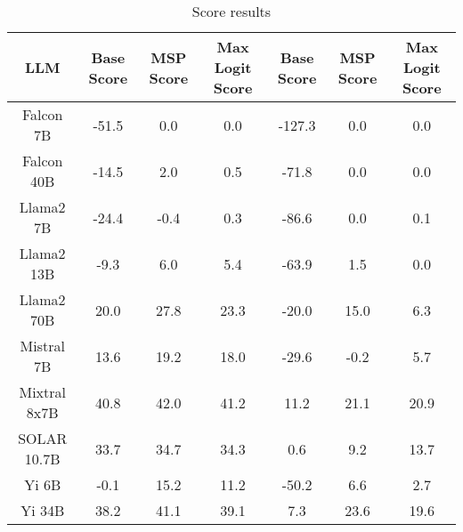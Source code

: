 \renewcommand\arraystretch{1.2}
\begin{table*}
\centering
\begin{tabular}{c|c|c|c|c|c|c}
LLM & Base Score & MSP Score & Max Logit Score & Base Score & MSP Score & Max Logit Score\\ \hline
Falcon 7B & -51.5 & 0.0 & 0.0 & -127.3 & 0.0 & 0.0\\
Falcon 40B & -14.5 & 2.0 & 0.5 & -71.8 & 0.0 & 0.0\\
Llama2 7B & -24.4 & -0.4 & 0.3 & -86.6 & 0.0 & 0.1\\
Llama2 13B & -9.3 & 6.0 & 5.4 & -63.9 & 1.5 & 0.0\\
Llama2 70B & 20.0 & 27.8 & 23.3 & -20.0 & 15.0 & 6.3\\
Mistral 7B & 13.6 & 19.2 & 18.0 & -29.6 & -0.2 & 5.7\\
Mixtral 8x7B & 40.8 & 42.0 & 41.2 & 11.2 & 21.1 & 20.9\\
SOLAR 10.7B & 33.7 & 34.7 & 34.3 & 0.6 & 9.2 & 13.7\\
Yi 6B & -0.1 & 15.2 & 11.2 & -50.2 & 6.6 & 2.7\\
Yi 34B & 38.2 & 41.1 & 39.1 & 7.3 & 23.6 & 19.6\\
\hline
\end{tabular}
\caption{Score results}
\end{table*}
\label{tab:score}
